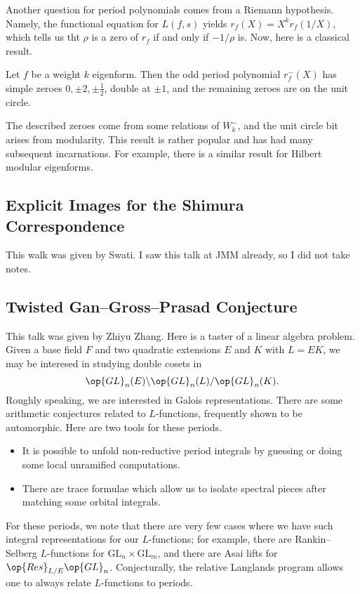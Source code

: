 \documentclass{article}
\begin{document}
Another question for period polynomials comes from a Riemann hypothesis. Namely, the functional equation for $L(f,s)$ yields $r_f(X)=X^kr_f(1/X)$, which tells us tht $\rho$ is a zero of $r_f$ if and only if $-1/\rho$ is. Now, here is a classical result.
\begin{theorem}
	Let $f$ be a weight $k$ eigenform. Then the odd period polynomial $r_f^-(X)$ has simple zeroes $0,\pm2,\pm\frac12$, double at $\pm1$, and the remaining zeroes are on the unit circle.
\end{theorem}
The described zeroes come from some relations of $W_k^-$, and the unit circle bit arises from modularity. This result is rather popular and has had many subsequent incarnations. For example, there is a similar result for Hilbert modular eigenforms.

\subsection{Explicit Images for the Shimura Correspondence}
This walk was given by Swati. I saw this talk at JMM already, so I did not take notes.

\subsection{Twisted Gan--Gross--Prasad Conjecture}
This talk was given by Zhiyu Zhang. Here is a taster of a linear algebra problem. Given a base field $F$ and two quadratic extensions $E$ and $K$ with $L=EK$, we may be interesed in studying double cosets in
\[\op{GL}_n(E)\backslash\op{GL}_n(L)/\op{GL}_n(K).\]
Roughly speaking, we are interested in Galois representations. There are some arithmetic conjectures related to $L$-functions, frequently shown to be automorphic. Here are two tools for these periods.
\begin{itemize}
	\item It is possible to unfold non-reductive period integrals by guessing or doing some local unramified computations.
	\item There are trace formulae which allow us to isolate spectral pieces after matching some orbital integrals.
\end{itemize}
For these periods, we note that there are very few cases where we have such integral representations for our $L$-functions; for example, there are Rankin--Selberg $L$-functions for $\mathrm{GL}_n\times\mathrm{GL}_m$, and there are Asai lifts for $\op{Res}_{L/E}\op{GL}_n$. Conjecturally, the relative Langlands program allows one to always relate $L$-functions to periods.
\end{document}
